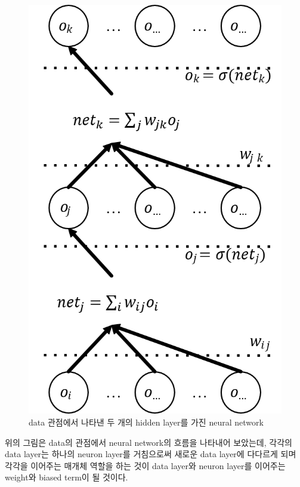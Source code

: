 \documentclass[draft=false]{oblivoir}
\begin{document}
\begin{figure}[ht] \centering 
\includegraphics[scale=0.5]{fig14_20.png} 
\caption{data 관점에서 나타낸 두 개의 hidden layer를 가진 neural network}
\label{fig:14-19}
\end{figure}

위의 그림은 data의 관점에서 neural network의 흐름을 나타내어 보았는데, 각각의 data layer는 하나의 neuron layer를 거침으로써 새로운 data layer에 다다르게 되며 각각을 이어주는 매개체 역할을 하는 것이 data layer와 neuron layer를 이어주는 weight와 biased term이 될 것이다. 
\end{document}
